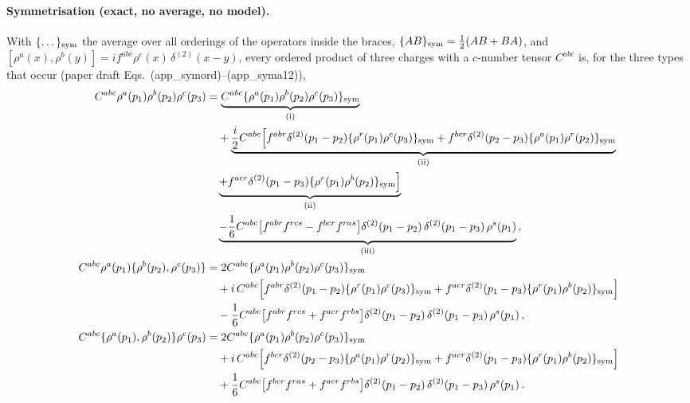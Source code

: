 \paragraph{Symmetrisation (exact, no average, no model).} With $\{\dots\}_{\rm sym}$ the average over all orderings of the operators inside the braces, $\{AB\}_{\rm sym}=\frac12(AB+BA)$, and $[\rho^{a}(x),\rho^{b}(y)]=if^{abc}\rho^{c}(x)\,\delta^{(2)}(x-y)$, every ordered product of three charges with a $c$-number tensor $C^{abc}$ is, for the three types that occur (paper draft Eqs.~(app\_symord)--(app\_syma12)),
\begin{align}
C^{abc}\rho^{a}(p_{1})\rho^{b}(p_{2})\rho^{c}(p_{3})&=\underbrace{C^{abc}\{\rho^{a}(p_{1})\rho^{b}(p_{2})\rho^{c}(p_{3})\}_{\rm sym}}_{\rm (i)}\notag\\
&\quad+\underbrace{\frac{i}{2}C^{abc}\Big[f^{abr}\delta^{(2)}(p_{1}-p_{2})\{\rho^{r}(p_{1})\rho^{c}(p_{3})\}_{\rm sym}+f^{bcr}\delta^{(2)}(p_{2}-p_{3})\{\rho^{a}(p_{1})\rho^{r}(p_{2})\}_{\rm sym}}_{\rm (ii)}\notag\\
&\quad\underbrace{+f^{acr}\delta^{(2)}(p_{1}-p_{3})\{\rho^{r}(p_{1})\rho^{b}(p_{2})\}_{\rm sym}\Big]}_{\rm (ii)}\notag\\
&\quad\underbrace{-\frac{1}{6}C^{abc}\big[f^{abr}f^{rcs}-f^{bcr}f^{ras}\big]\delta^{(2)}(p_{1}-p_{2})\,\delta^{(2)}(p_{1}-p_{3})\,\rho^{s}(p_{1})}_{\rm (iii)}\,,\label{eq:D-ord}\\
C^{abc}\rho^{a}(p_{1})\{\rho^{b}(p_{2}),\rho^{c}(p_{3})\}&=2C^{abc}\{\rho^{a}(p_{1})\rho^{b}(p_{2})\rho^{c}(p_{3})\}_{\rm sym}\notag\\
&\quad+i\,C^{abc}\Big[f^{abr}\delta^{(2)}(p_{1}-p_{2})\{\rho^{r}(p_{1})\rho^{c}(p_{3})\}_{\rm sym}+f^{acr}\delta^{(2)}(p_{1}-p_{3})\{\rho^{r}(p_{1})\rho^{b}(p_{2})\}_{\rm sym}\Big]\notag\\
&\quad-\frac{1}{6}C^{abc}\big[f^{abr}f^{rcs}+f^{acr}f^{rbs}\big]\delta^{(2)}(p_{1}-p_{2})\,\delta^{(2)}(p_{1}-p_{3})\,\rho^{s}(p_{1})\,,\label{eq:D-r12}\\
C^{abc}\{\rho^{a}(p_{1}),\rho^{b}(p_{2})\}\rho^{c}(p_{3})&=2C^{abc}\{\rho^{a}(p_{1})\rho^{b}(p_{2})\rho^{c}(p_{3})\}_{\rm sym}\notag\\
&\quad+i\,C^{abc}\Big[f^{bcr}\delta^{(2)}(p_{2}-p_{3})\{\rho^{a}(p_{1})\rho^{r}(p_{2})\}_{\rm sym}+f^{acr}\delta^{(2)}(p_{1}-p_{3})\{\rho^{r}(p_{1})\rho^{b}(p_{2})\}_{\rm sym}\Big]\notag\\
&\quad+\frac{1}{6}C^{abc}\big[f^{bcr}f^{ras}+f^{acr}f^{rbs}\big]\delta^{(2)}(p_{1}-p_{2})\,\delta^{(2)}(p_{1}-p_{3})\,\rho^{s}(p_{1})\,.\label{eq:D-r21}
\end{align}
